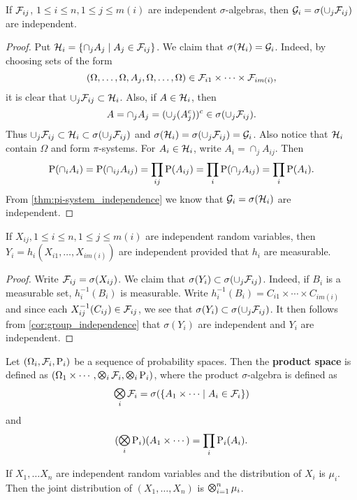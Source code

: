 \begin{corollary}\label{cor:group_independence}
    If $\F_{ij}$, $1\leq i\leq n, 1\leq j\leq m(i)$ are independent $\sigma$-algebras, 
    then $\G_i = \sigma(\cup_j \F_{ij})$ are independent. 
\end{corollary}
\begin{proof}
    Put $\H_i = \Set{\cap_j A_j}{A_j\in\F_{{ij}}}$. We claim that $\sigma(\H_i) = \G_i$. 
    Indeed, by choosing sets of the form 
    \begin{equation*}
        (\Omega,\ldots,\Omega,A_j,\Omega,\ldots,\Omega)\in\F_{i1}\times\cdots\times\F_{im(i)}, 
    \end{equation*}
    it is clear that $\cup_j\F_{ij} \subset \H_i$. Also, if $A\in\H_i$, then 
    \begin{equation*}
        A = \cap_j A_j = (\cup_j(A_j^c))^c \in\sigma(\cup_j\F_{ij}). 
    \end{equation*}
    Thus $\cup_j \F_{ij}\subset\H_i\subset\sigma(\cup_j \F_{ij})$ and 
    $\sigma(\H_i) = \sigma(\cup_j \F_{ij}) = \G_i$. Also notice that $\H_i$ 
    contain $\Omega$ and form $\pi$-systems. For $A_i\in\H_i$, write $A_i = \cap_j A_{ij}$. 
    Then 
    \begin{equation*}
        \P(\cap_i A_i) = \P(\cap_{ij}A_{ij}) = \prod_{ij}\P(A_{ij}) = \prod_i\P(\cap_j A_{ij}) 
        = \prod_i \P(A_i).
    \end{equation*}
    From \cref{thm:pi-system_independence} we know that $\G_i = \sigma(\H_i)$ are 
    independent. 
\end{proof}

\begin{corollary}
    If $X_{ij}, 1\leq i\leq n, 1\leq j\leq m(i)$ are independent random variables, then 
    $Y_i = h_i(X_{i1},\ldots,X_{im(i)})$ are independent provided that $h_i$ are measurable. 
\end{corollary}
\begin{proof}
    Write $\F_{ij} = \sigma(X_{ij})$. We claim that $\sigma(Y_i) \subset \sigma(\cup_j \F_{ij})$. 
    Indeed, if $B_i$ is a measurable set, $h_i^{-1}(B_i)$ is measurable. Write 
    $h_i^{-1}(B_i) = C_{i1}\times\cdots\times C_{im(i)}$ and since each 
    $X_{ij}^{-1}(C_{ij})\in\F_{ij}$, we see that $\sigma(Y_i)\subset\sigma(\cup_{j}\F_{ij})$. 
    It then follows from \cref{cor:group_independence} that $\sigma(Y_i)$ are independent 
    and $Y_i$ are independent. 
\end{proof}

\begin{definition}
    Let $(\Omega_i,\F_i,\P_i)$ be a sequence of probability spaces. Then the 
    \textbf{product space} is defined as $(\Omega_1\times\cdots,\motimes_i\F_i,\motimes_i\P_i)$, 
    where the product $\sigma$-algebra is defined as 
    \begin{equation*}
        \motimes_i\F_i = \sigma(\Set{A_1\times\cdots}{A_i\in\F_i})
    \end{equation*} 
    and 
    \begin{equation*}
        (\motimes_i\P_i)(A_1\times\cdots) = \prod_i\P_i(A_i).
    \end{equation*} 
\end{definition}

\begin{theorem}
    If $X_1,\ldots X_n$ are independent random variables and the distribution 
    of $X_i$ is $\mu_i$. Then the joint distribution of $(X_1,\ldots,X_n)$ is 
    $\motimes_{i=1}^n\mu_i$. 
\end{theorem}